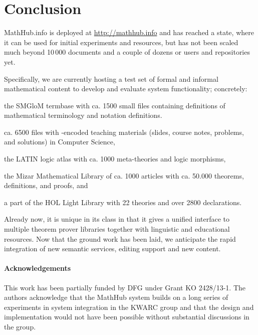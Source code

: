 \documentclass{llncs}
\def\sys{\textsf{MathHub.info}\xspace}
\begin{document}
\section{Conclusion}\label{sec:concl}

\sys is deployed at \url{http://mathhub.info} and has reached a state, where it can be
used for initial experiments and resources, but has not been scaled much beyond 10\,000
documents and a couple of dozens or users and repositories yet.

Specifically, we are currently hosting a test set of formal and informal
 mathematical content to develop and evaluate system functionality; concretely:
 \begin{inparaenum}[\em i\rm)]
 \item the SMGloM termbase with ca. 1500 small \sTeX files containing definitions of
   mathematical terminology and notation definitions.
 \item ca. 6500 files with \sTeX-encoded teaching materials (slides, course notes,
   problems, and solutions) in Computer Science,
 \item the LATIN logic atlas with ca. 1000 meta-theories and logic morphisms, 
 \item the Mizar Mathematical Library of ca. 1000 articles with ca. 50.000 theorems,
   definitions, and proofs, and
 \item a part of the HOL Light Library with 22 theories and over 2800 declarations.
 \end{inparaenum}
Already now, it is unique
in its class in that it gives a unified interface to multiple theorem prover libraries
together with linguistic and educational resources. Now that the ground work has been
laid, we anticipate the rapid integration of new semantic services, editing support and
new content.

\paragraph{Acknowledgements} This work has been partially funded by DFG under Grant KO
2428/13-1. The authors acknowledge that the MathHub system builds on a long series of
experiments in system integration in the KWARC group and that the design and
implementation would not have been possible without substantial discussions in the group.

\printbibliography
\end{document}
